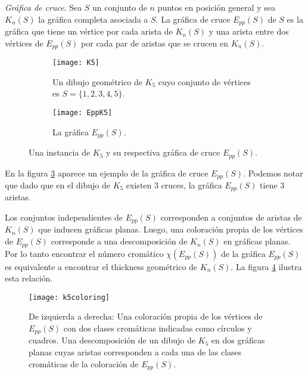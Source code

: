 \begin{definition}{\emph{Gráfica de cruce}.}
  Sea $S$ un conjunto de $n$ puntos en posición general y sea $K_n(S)$ la gráfica completa
  asociada a $S$. La gráfica de cruce $E_{pp}(S)$ de $S$ es la gráfica que tiene un vértice
  por cada arista de $K_n(S)$ y una arista entre dos vértices de $E_{pp}(S)$ por cada par de aristas
  que se crucen en $K_n(S)$.
\end{definition}

\begin{figure}
\begin{subfigure}{.5\textwidth}
  \centering
  \texttt{[image: K5]}
  \caption{Un dibujo geométrico de $K_5$ cuyo conjunto de vértices es $S=\{1,2,3,4,5\}$.}
  \label{fig:k5}
\end{subfigure}%
\begin{subfigure}{.5\textwidth}
  \centering
  \texttt{[image: EppK5]}
  \caption{La gráfica $E_{pp}(S)$.}
  \label{fig:eppk5}
\end{subfigure}
\caption{Una instancia de $K_5$ y su respectiva gráfica de cruce $E_{pp}(S)$.}
\label{fig:ejemploeppk5}
\end{figure}

En la figura \ref{fig:ejemploeppk5} aparece un ejemplo de la gráfica de cruce $E_{pp}(S)$.
Podemos notar que dado que en el dibujo de $K_5$ existen 3 cruces, la gráfica $E_{pp}(S)$
tiene 3 aristas.

Los conjuntos independientes de $E_{pp}(S)$ corresponden a conjuntos de aristas de $K_n(S)$
que inducen gráficas planas. Luego, una coloración propia de los vértices de $E_{pp}(S)$
corresponde a una descomposición de $K_n(S)$ en gráficas planas.
Por lo tanto encontrar el número cromático $\chi(E_{pp}(S))$ de la gráfica
$E_{pp}(S)$ es equivalente a encontrar el thickness geométrico de $K_n(S)$.
La figura \ref{fig:k5coloring} ilustra esta relación.

\begin{figure}
  \centering
  \texttt{[image: k5coloring]}
  \caption{De izquierda a derecha: Una coloración propia de los vértices de $E_{pp}(S)$ con dos
  clases cromáticas indicadas como círculos y cuadros.
  Una descomposición de un dibujo de $K_5$ en dos gráficas planas
  cuyas aristas corresponden a cada una de las clases cromáticas de la coloración
  de $E_{pp}(S)$.}
  \label{fig:k5coloring}
\end{figure}

